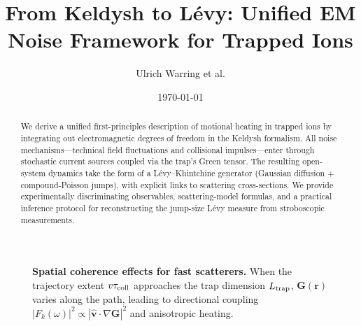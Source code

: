 \documentclass[11pt,a4paper]{article}
\title{From Keldysh to L\'evy: Unified EM Noise Framework for Trapped Ions}
\author{Ulrich Warring et al.}
\date{\today}
\begin{document}
\maketitle

\begin{abstract}
We derive a unified first-principles description of motional heating in trapped ions by integrating out electromagnetic degrees of freedom in the Keldysh formalism. 
All noise mechanisms---technical field fluctuations and collisional impulses---enter through stochastic current sources coupled via the trap's Green tensor. 
The resulting open-system dynamics take the form of a L\'evy--Khintchine generator (Gaussian diffusion + compound-Poisson jumps), with explicit links to scattering cross-sections. 
We provide experimentally discriminating observables, scattering-model formulas, and a practical inference protocol for reconstructing the jump-size L\'evy measure from stroboscopic measurements.
\end{abstract}

\tableofcontents






\begin{figure}[h]
\centering

\caption{%
\textbf{Spatial coherence effects for fast scatterers.}
When the trajectory extent $v\tau_{\rm coll}$ approaches the trap dimension $L_{\rm trap}$, $\mathbf{G}(\mathbf{r})$ varies along the path, leading to directional coupling $|F_k(\omega)|^2 \propto |\hat{\mathbf{v}}\!\cdot\!\nabla\mathbf{G}|^2$ and anisotropic heating.}
\label{fig:trajectory_coherence}
\end{figure}




\end{document}
